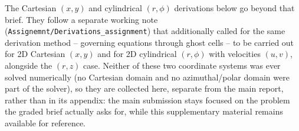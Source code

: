 \documentclass[12pt,a4paper]{article}
\begin{document}
The Cartesian $(x,y)$ and cylindrical $(r,\phi)$ derivations below go beyond
that brief. They follow a separate working note
(\texttt{Assignemnt/Derivations\_assignment}) that additionally called for
the same derivation method -- governing equations through ghost cells -- to
be carried out for 2D Cartesian $(x,y)$ and for 2D cylindrical $(r,\phi)$
with velocities $(u,v)$, alongside the $(r,z)$ case. Neither of these two
coordinate systems was ever solved numerically (no Cartesian domain and no
azimuthal/polar domain were part of the solver), so they are collected here,
separate from the main report, rather than in its appendix: the main
submission stays focused on the problem the graded brief actually asks for,
while this supplementary material remains available for reference.

\newpage



\newpage


\end{document}
